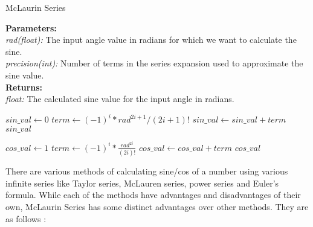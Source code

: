     \begin{algorithm}
      \caption{McLaurin Series}\label{Sin of}
      \begin{tabbing}
        \textbf{Parameters:}\\
        \hspace{1em}\textit{rad(float):} The input angle value in radians for which we want to calculate the sine.\\
        \hspace{1em}\textit{precision(int):} Number of terms in the series expansion used to approximate the sine value.\\
        
        \textbf{Returns:}\\
          \hspace{1em}\textit{float:} The calculated sine value for the input angle in radians.\\
      \end{tabbing}
      \begin{algorithmic}[1]
          \State $sin\_val \gets 0$ 
             
              \State $term \gets (-1)^i * rad^{2i+1} / (2i+1)!$ 
              \State $sin\_val \gets sin\_val + term$ 
            \EndFor
          \State \Return $sin\_val$
        \EndFunction
      \end{algorithmic}
      \hspace*{2em}
      \begin{algorithmic}[1]
          \State $cos\_val \gets 1$
             
              \State $term \gets (-1)^i * \frac{rad^{2i}}{(2i)!}$ 
              \State $cos\_val \gets cos\_val + term$
            \EndFor
          \State \Return $cos\_val$
        \EndFunction
      \end{algorithmic}
    \end{algorithm}
    \pagebreak
    \begin{flushleft}
    There are various methods of calculating sine/cos of a number using various infinite series like Taylor series, McLauren series, power series and Euler's formula.
    While each of the methods have advantages and disadvantages of their own, McLaurin Series has some distinct advantages over other methods. They are as follows :
    \end{flushleft}
